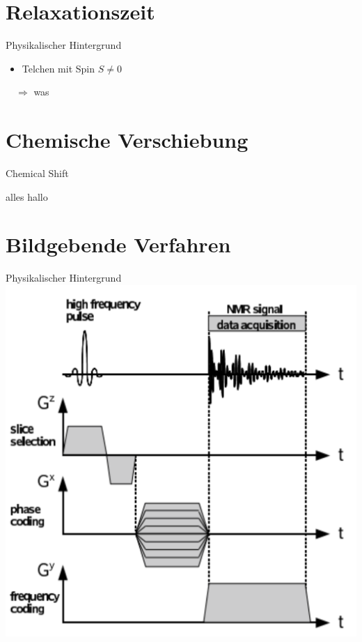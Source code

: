
\thispagestyle{empty}
\frame{\titlepage}


\section{Relaxationszeit}
\begin{frame}{Physikalischer Hintergrund}
	\begin{itemize}
	\item Telchen mit Spin $S\neq 0$
	\end{itemize}
	$\quad\Rightarrow$ was
\end{frame}




\section{Chemische Verschiebung}
\begin{frame}{Chemical Shift}
\begin{exampleblock}{alles}
hallo
\end{exampleblock}
\end{frame}





\section{Bildgebende Verfahren} %
\begin{frame}{Physikalischer Hintergrund}
\includegraphics[scale=.1]{images//signal.png}
\end{frame}




